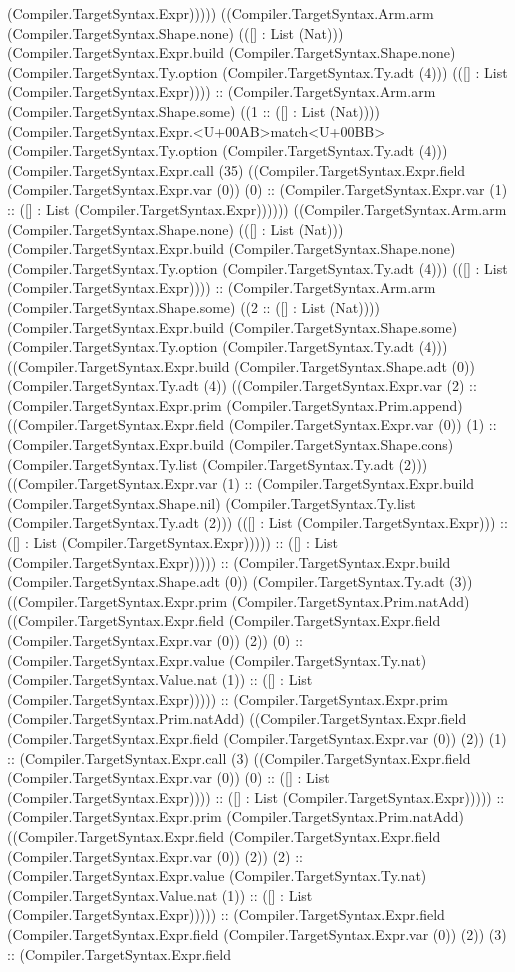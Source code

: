 \documentclass[11pt]{article}
\begin{document}
(Compiler.TargetSyntax.Expr))))) ((Compiler.TargetSyntax.Arm.arm (Compiler.TargetSyntax.Shape.none) (([] : List (Nat))) (Compiler.TargetSyntax.Expr.build (Compiler.TargetSyntax.Shape.none) (Compiler.TargetSyntax.Ty.option (Compiler.TargetSyntax.Ty.adt (4))) (([] : List (Compiler.TargetSyntax.Expr)))) :: (Compiler.TargetSyntax.Arm.arm (Compiler.TargetSyntax.Shape.some) ((1 :: ([] : List (Nat)))) (Compiler.TargetSyntax.Expr.<U+00AB>match<U+00BB> (Compiler.TargetSyntax.Ty.option (Compiler.TargetSyntax.Ty.adt (4))) (Compiler.TargetSyntax.Expr.call (35) ((Compiler.TargetSyntax.Expr.field (Compiler.TargetSyntax.Expr.var (0)) (0) :: (Compiler.TargetSyntax.Expr.var (1) :: ([] : List (Compiler.TargetSyntax.Expr)))))) ((Compiler.TargetSyntax.Arm.arm (Compiler.TargetSyntax.Shape.none) (([] : List (Nat))) (Compiler.TargetSyntax.Expr.build (Compiler.TargetSyntax.Shape.none) (Compiler.TargetSyntax.Ty.option (Compiler.TargetSyntax.Ty.adt (4))) (([] : List (Compiler.TargetSyntax.Expr)))) :: (Compiler.TargetSyntax.Arm.arm (Compiler.TargetSyntax.Shape.some) ((2 :: ([] : List (Nat)))) (Compiler.TargetSyntax.Expr.build (Compiler.TargetSyntax.Shape.some) (Compiler.TargetSyntax.Ty.option (Compiler.TargetSyntax.Ty.adt (4))) ((Compiler.TargetSyntax.Expr.build (Compiler.TargetSyntax.Shape.adt (0)) (Compiler.TargetSyntax.Ty.adt (4)) ((Compiler.TargetSyntax.Expr.var (2) :: (Compiler.TargetSyntax.Expr.prim (Compiler.TargetSyntax.Prim.append) ((Compiler.TargetSyntax.Expr.field (Compiler.TargetSyntax.Expr.var (0)) (1) :: (Compiler.TargetSyntax.Expr.build (Compiler.TargetSyntax.Shape.cons) (Compiler.TargetSyntax.Ty.list (Compiler.TargetSyntax.Ty.adt (2))) ((Compiler.TargetSyntax.Expr.var (1) :: (Compiler.TargetSyntax.Expr.build (Compiler.TargetSyntax.Shape.nil) (Compiler.TargetSyntax.Ty.list (Compiler.TargetSyntax.Ty.adt (2))) (([] : List (Compiler.TargetSyntax.Expr))) :: ([] : List (Compiler.TargetSyntax.Expr))))) :: ([] : List (Compiler.TargetSyntax.Expr))))) :: (Compiler.TargetSyntax.Expr.build (Compiler.TargetSyntax.Shape.adt (0)) (Compiler.TargetSyntax.Ty.adt (3)) ((Compiler.TargetSyntax.Expr.prim (Compiler.TargetSyntax.Prim.natAdd) ((Compiler.TargetSyntax.Expr.field (Compiler.TargetSyntax.Expr.field (Compiler.TargetSyntax.Expr.var (0)) (2)) (0) :: (Compiler.TargetSyntax.Expr.value (Compiler.TargetSyntax.Ty.nat) (Compiler.TargetSyntax.Value.nat (1)) :: ([] : List (Compiler.TargetSyntax.Expr))))) :: (Compiler.TargetSyntax.Expr.prim (Compiler.TargetSyntax.Prim.natAdd) ((Compiler.TargetSyntax.Expr.field (Compiler.TargetSyntax.Expr.field (Compiler.TargetSyntax.Expr.var (0)) (2)) (1) :: (Compiler.TargetSyntax.Expr.call (3) ((Compiler.TargetSyntax.Expr.field (Compiler.TargetSyntax.Expr.var (0)) (0) :: ([] : List (Compiler.TargetSyntax.Expr)))) :: ([] : List (Compiler.TargetSyntax.Expr))))) :: (Compiler.TargetSyntax.Expr.prim (Compiler.TargetSyntax.Prim.natAdd) ((Compiler.TargetSyntax.Expr.field (Compiler.TargetSyntax.Expr.field (Compiler.TargetSyntax.Expr.var (0)) (2)) (2) :: (Compiler.TargetSyntax.Expr.value (Compiler.TargetSyntax.Ty.nat) (Compiler.TargetSyntax.Value.nat (1)) :: ([] : List (Compiler.TargetSyntax.Expr))))) :: (Compiler.TargetSyntax.Expr.field (Compiler.TargetSyntax.Expr.field (Compiler.TargetSyntax.Expr.var (0)) (2)) (3) :: (Compiler.TargetSyntax.Expr.field 
\end{document}
